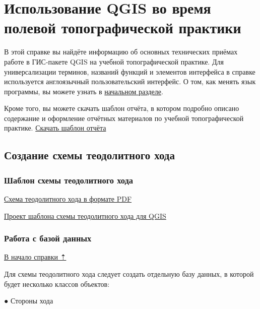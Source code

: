\documentclass[
  russian,
  letterpaper,
  DIV=11,
  numbers=noendperiod]{scrreprt}
\begin{document}
\chapter{Использование QGIS во время полевой топографической
практики}\label{ux438ux441ux43fux43eux43bux44cux437ux43eux432ux430ux43dux438ux435-qgis-ux432ux43e-ux432ux440ux435ux43cux44f-ux43fux43eux43bux435ux432ux43eux439-ux442ux43eux43fux43eux433ux440ux430ux444ux438ux447ux435ux441ux43aux43eux439-ux43fux440ux430ux43aux442ux438ux43aux438}

\label{practice}{}

В этой справке вы найдёте информацию об основных технических приёмах
работе в ГИС-пакете QGIS на учебной топографической практике. Для
универсализации терминов, названий функций и элементов интерфейса в
справке используется англоязычный пользовательский интерфейс. О том, как
менять язык программы, вы можете узнать в \hyperref[global]{начальном
разделе}.

Кроме того, вы можете скачать шаблон отчёта, в котором подробно описано
содержание и оформление отчётных материалов по учебной топографической
практике. \href{https://disk.yandex.ru/i/MUvXFXTTfx4NTA}{Скачать шаблон
отчёта}

\section{Создание схемы теодолитного хода}\label{practice-theod}

\subsection{Шаблон схемы теодолитного
хода}\label{practice-theod-template}

\href{https://disk.yandex.ru/i/Z3H_BOK2KYfDRQ}{Схема теодолитного хода в
формате PDF}

\href{https://disk.yandex.ru/d/JcXRhKuiqoVTLg}{Проект шаблона схемы
теодолитного хода для QGIS}

\subsection{Работа с базой данных}\label{practice-theod-DB}

\hyperref[practice-theod]{В начало справки ⇡}

Для схемы теодолитного хода следует создать отдельную базу данных, в
которой будет несколько классов объектов:

● Стороны хода
\end{document}
